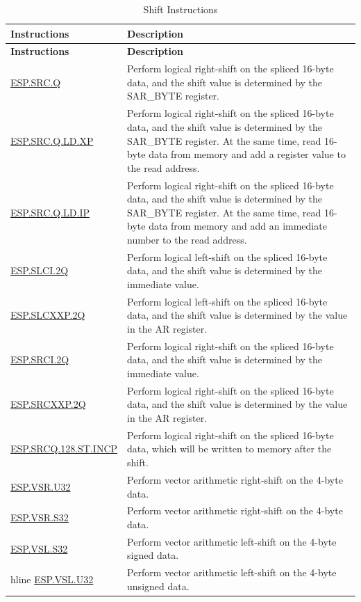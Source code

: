 \begin{longtable}[c]{|l|m{11cm}|}
    \caption{Shift Instructions}
    \label{tab:pie-shift-instructions}\\
    \hline
    \rowcolor{lightgray}
    \textbf{Instructions} & \textbf{Description} \\\hline
    \endfirsthead
    \rowcolor{lightgray}
    \textbf{Instructions} & \textbf{Description} \\\hline
    \endhead
    \endfoot
    
    \hyperref[instruction:ESPSRCQ]{ESP.SRC.Q} & Perform logical right-shift on the spliced 16-byte data, and the shift value is determined by the SAR\_BYTE register.
    \\\hline
    \hyperref[instruction:ESPSRCQLDXP]{ESP.SRC.Q.LD.XP} & Perform logical right-shift on the spliced 16-byte data, and the shift value is determined by the SAR\_BYTE register. At the same time, read 16-byte data from memory and add a register value to the read address.
    \\\hline
    \hyperref[instruction:ESPSRCQLDIP]{ESP.SRC.Q.LD.IP} & Perform logical right-shift on the spliced 16-byte data, and the shift value is determined by the SAR\_BYTE register. At the same time, read 16-byte data from memory and add an immediate number to the read address.
    \\\hline
    \hyperref[instruction:ESPSLCI2Q]{ESP.SLCI.2Q} & Perform logical left-shift on the spliced 16-byte data, and the shift value is determined by the immediate value.
    \\\hline
    \hyperref[instruction:ESPSLCXXP2Q]{ESP.SLCXXP.2Q} & Perform logical left-shift on the spliced 16-byte data, and the shift value is determined by the value in the AR register.
    \\\hline
    \hyperref[instruction:ESPSRCI2Q]{ESP.SRCI.2Q} & Perform logical right-shift on the spliced 16-byte data, and the shift value is determined by the immediate value.
    \\\hline
    \hyperref[instruction:ESPSRCXXP2Q]{ESP.SRCXXP.2Q} & Perform logical right-shift on the spliced 16-byte data, and the shift value is determined by the value in the AR register.
    \\\hline
    \hyperref[instruction:ESPSRCQ128STINCP]{ESP.SRCQ.128.ST.INCP} & Perform logical right-shift on the spliced 16-byte data, which will be written to memory after the shift.
    \\\hline
    \hyperref[instruction:ESPVSRU32]{ESP.VSR.U32} & Perform vector arithmetic right-shift on the 4-byte data.
    \\\hline
       \hyperref[instruction:ESPVSRS32]{ESP.VSR.S32} & Perform vector arithmetic right-shift on the 4-byte data.
    \\\hline
    \hyperref[instruction:ESPVSLS32]{ESP.VSL.S32} & Perform vector arithmetic left-shift on the 4-byte signed data.
    \\hline
    \hyperref[instruction:ESPVSLU32]{ESP.VSL.U32} & Perform vector arithmetic left-shift on the 4-byte unsigned data.
    \\\hline


\end{longtable}
